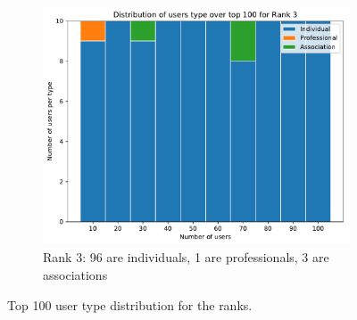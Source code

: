 \begin{figure}
	\hfill%
	\begin{subfigure}{.49\textwidth}
		\centering
		\includegraphics[width=1\textwidth]{figures/rank3-distribution.pdf}
		\caption{Rank 3: 96 are individuals, 1 are professionals, 3 are associations}
		\label{fig:rank3-distribution}
	\end{subfigure}
	\caption{Top 100 user type distribution for the ranks.}
	\label{fig:ranks-distribution}
\end{figure}
%